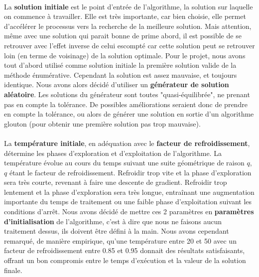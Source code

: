 \documentclass[12pt]{article}
\begin{document}
\paragraph{}La \textbf{solution initiale} est le point d'entrée de l'algorithme, la solution sur laquelle on commence à travailler. Elle est très importante, car bien choisie, elle permet d'accélérer le processus vers la recherche de la meilleure solution. Mais attention, même avec une solution qui parait bonne de prime abord, il est possible de se retrouver avec l'effet inverse de celui escompté car cette solution peut se retrouver loin (en terme de voisinage) de la solution optimale. Pour le projet, nous avons tout d'abord utilisé comme solution initiale la première solution valide de la méthode énumérative. Cependant la solution est assez mauvaise, et toujours identique. Nous avons alors décidé d'utiliser un \textbf{générateur de solution aléatoire}. Les solutions du générateur sont toutes "quasi-équilibrée", ne prenant pas en compte la tolérance. De possibles améliorations seraient donc de prendre en compte la tolérance, ou alors de générer une solution en sortie d'un algorithme glouton (pour obtenir une première solution pas trop mauvaise).

\paragraph{}La \textbf{température initiale}, en adéquation avec le \textbf{facteur de refroidissement}, détermine les phases d'exploration et d'exploitation de l'algorithme. La température évolue au cours du temps suivant une suite géométrique de raison $q$, $q$ étant le facteur de refroidissement. Refroidir trop vite et la phase d'exploration sera très courte, revenant à faire une descente de gradient. Refroidir trop lentement et la phase d'exploration sera très longue, entraînant une augmentation importante du temps de traitement ou une faible phase d'exploitation suivant les conditions d'arrêt. Nous avons décidé de mettre ces 2 paramètres en \textbf{paramètres d'initialisation} de l'algorithme, c'est à dire que nous ne faisons aucun traitement dessus, ils doivent être défini à la main. Nous avons cependant remarqué, de manière empirique, qu'une température entre 20 et 50 avec un facteur de refroidissement entre 0.85 et 0.95 donnait des résultats satisfaisants, offrant un bon compromis entre le temps d'exécution et la valeur de la solution finale.
\end{document}
